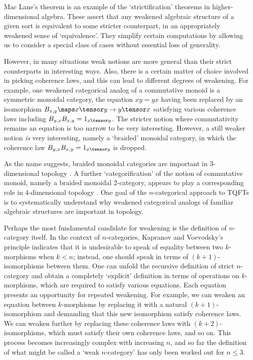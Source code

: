 Mac Lane's theorem is an example of the `strictification' theorems in
higher- \break dimensional algebra.  These assert that any weakened
algebraic structure of a given sort is equivalent to some stricter
counterpart, in an appropriately weakened sense of `equivalence'.  They
simplify certain computations by allowing us to consider a special class
of cases without essential loss of generality.

However, in many situations weak notions are more general than
their strict counterparts in interesting ways.  Also,
there is a certain matter of choice involved in picking
coherence laws, and this can lead to different degrees of weakening.
For example, one
weakened categorical analog of a commutative monoid is a
symmetric monoidal category, the equation  $xy = yx$ having been
replaced by an isomorphism $B_{x,y} \maps x \tensor y \to y
\tensor x$ satisfying various coherence laws including $B_{y,x}B_{x,y} = 1_{x
\tensor y}$.  The stricter notion where commutativity remains
an equation is too narrow to be very interesting.  However, a still weaker
notion {\it is} very interesting, namely a `braided' monoidal
category, in which the coherence law $B_{y,x}B_{x,y} = 1_{x
\tensor y}$ is dropped.

As the name suggests, braided monoidal
categories are important in 3-dimensional topology
\cite{CP,FY,RT}.  A further `categorification' of the
notion of commutative monoid, namely a braided monoidal
2-category, appears to play a corresponding role in 4-dimensional
topology \cite{CS,KV}.   One goal of the $n$-categorical approach
to TQFTs is to systematically understand why weakened categorical
analogs of familiar algebraic structures are important in
topology.

Perhaps the most fundamental candidate for weakening is the
definition of $n$-category itself.   In the context of $n$-categories,
Kapranov and Voevodsky's principle indicates that it is
undesirable to speak of equality between two $k$-morphisms
when $k < n$; instead, one should speak in terms of $(k+1)$-isomorphisms
between them.  One can unfold the recursive
definition of strict $n$-category and obtain a
completely `explicit' definition in terms of operations
on $k$-morphisms, which are required to satisfy various
equations.  Each equation presents an opportunity for repeated
weakening.  For example, we can weaken an equation between
$k$-morphisms by replacing it with a natural $(k+1)$-isomorphism and
demanding that this new isomorphism satisfy coherence laws.
We can weaken further by replacing these coherence laws with
$(k+2)$-isomorphisms, which must satisfy their own coherence
laws, and so on.   This process becomes increasingly complex
with increasing $n$, and so far the definition of what might be called
a `weak $n$-category' has only been worked out for $n \le 3$.


